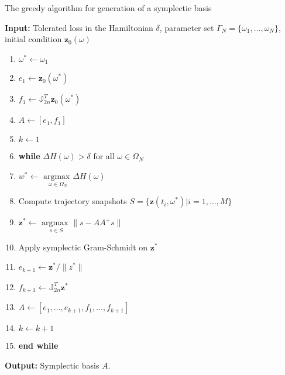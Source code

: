 \begin{algorithm} 
\caption{The greedy algorithm for generation of a symplectic basis} \label{alg:SyMo:3}
{\bf Input:} Tolerated loss in the Hamiltonian $\delta$, parameter set $\Gamma_N = \{\omega_1,\dots,\omega_N\}$, initial condition $\mathbf z_0(\omega)$
\begin{enumerate}
\item $\omega^* \leftarrow \omega_1$
\item $e_1 \leftarrow \mathbf z_0(\omega^*)$
\item $f_1 \leftarrow \mathbb J^T_{2n} \mathbf z_0(\omega^*)$
\item $A \leftarrow [e_1,f_1]$
\item $k \leftarrow 1$
\item \textbf{while} $\Delta H(\omega) > \delta$ for all $\omega \in \Omega_N$
\item \hspace{0.5cm} $w^* \leftarrow$ $\underset{\omega\in \Omega_N}{\text{argmax }}\Delta H(\omega)$
\item \hspace{0.5cm} Compute trajectory snapshots $S=\{ \mathbf z(t_i,\omega^*) | i = 1,\dots,M \}$
\item \hspace{0.5cm} $\mathbf z^* \leftarrow$ $\underset{s\in S}{\text{argmax }} \| s - AA^+s \|$
\item \hspace{0.5cm} Apply symplectic Gram-Schmidt on $\mathbf z^*$
\item \hspace{0.5cm} $e_{k+1} \leftarrow \mathbf z^*/ \| z^*\|$
\item \hspace{0.5cm}$f_{k+1} \leftarrow \mathbb J^T_{2n} \mathbf z^*$
\item \hspace{0.5cm} $A \leftarrow [e_1,\dots ,e_{k+1} , f_1,\dots,f_{k+1}]$
\item \hspace{0.5cm} $k \leftarrow k+1$
\item \textbf{end while}
\end{enumerate}
\vspace{0.5cm}
{\bf Output:} Symplectic basis $A$.
\end{algorithm}

